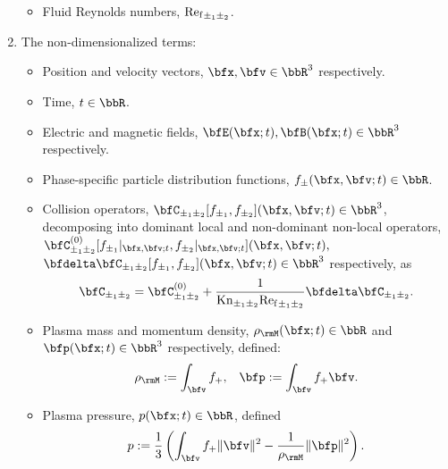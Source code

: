 \begin{enumerate}
\begin{itemize}
            \item  Fluid Reynolds numbers, ${\mathrm{Re}_{\mathrm{f}}}_{\pm_{1}\pm_{2}}$.
        \end{itemize}

        \item  The non-dimensionalized terms: 
        \begin{itemize}
            \item  Position and velocity vectors, $\bfx, \bfv  \in  \bbR^{3}$ respectively.
            
            \item  Time, $t  \in  \bbR$.
            
            \item  Electric and magnetic fields, $\bfE(\bfx; t), \bfB(\bfx; t)  \in  \bbR^{3}$ respectively.
            
            \item  Phase-specific particle distribution functions, $f_{\pm}(\bfx, \bfv; t)  \in  \bbR$.
            
            \item  Collision operators, $\bfC_{\pm_{1}\pm_{2}}[f_{\pm_{1}}, f_{\pm_{2}}](\bfx, \bfv; t)  \in  \bbR^{3}$, decomposing into dominant local and non-dominant non-local operators, $\bfC_{\pm_{1}\pm_{2}}^{(0)}[f_{\pm_{1}}|_{\bfx, \bfv; t}, f_{\pm_{2}}|_{\bfx, \bfv; t}](\bfx, \bfv; t),$ \\ $\bfdelta\bfC_{\pm_{1}\pm_{2}}[f_{\pm_{1}}, f_{\pm_{2}}](\bfx, \bfv; t)  \in  \bbR^{3}$ respectively, as
            \begin{equation}
                \bfC_{\pm_{1}\pm_{2}}  =  \bfC_{\pm_{1}\pm_{2}}^{(0)} + \frac{1}{\rmKn_{\pm_{1}\pm_{2}}{\rmRef}_{\pm_{1}\pm_{2}}}\bfdelta\bfC_{\pm_{1}\pm_{2}}.
            \end{equation}

            \item  Plasma mass and momentum density, $\rho_{\rmM}(\bfx; t)  \in  \bbR$ and $\bfp(\bfx; t)  \in  \bbR^{3}$ respectively, defined:
            \begin{align}
                \rho_{\rmM}  :=  \int_{\bfv}f_{+},  &&
                       \bfp  :=  \int_{\bfv}f_{+}\bfv.
            \end{align}

            \item  Plasma pressure, $p(\bfx; t)  \in  \bbR$, defined
            \begin{equation}
                p  :=  \frac{1}{3}\left(\int_{\bfv}f_{+}\|\bfv\|^{2} - \frac{1}{\rho_{\rmM}}\|\bfp\|^{2}\right).
            \end{equation}


\end{itemize}
\end{enumerate}
